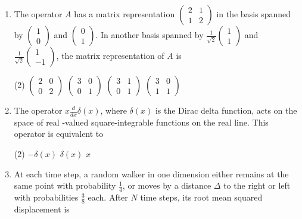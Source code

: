 \begin{enumerate}
\item The operator $A$ has a matrix representation $\left(\begin{array}{ll}2 & 1 \\ 1 & 2\end{array}\right)$ in the basis spanned by $\left(\begin{array}{l}1 \\ 0\end{array}\right)$ and $\left(\begin{array}{l}0 \\ 1\end{array}\right)$. In another basis spanned by $\frac{1}{\sqrt{2}}\left(\begin{array}{l}1 \\ 1\end{array}\right)$ and $\frac{1}{\sqrt{2}}\left(\begin{array}{c}1 \\ -1\end{array}\right)$, the matrix representation of $A$ is
 \begin{tasks}(2)
	\task[\textbf{a.}]$\left(\begin{array}{ll}2 & 0 \\ 0 & 2\end{array}\right)$
	\task[\textbf{b.}]$\left(\begin{array}{ll}3 & 0 \\ 0 & 1\end{array}\right)$
	\task[\textbf{c.}]$\left(\begin{array}{ll}3 & 1 \\ 0 & 1\end{array}\right)$
	\task[\textbf{d.}] $\left(\begin{array}{ll}3 & 0 \\ 1 & 1\end{array}\right)$
\end{tasks}
\item The operator $x \frac{d}{d x} \delta(x)$, where $\delta(x)$ is the Dirac delta function, acts on the space of real -valued square-integrable functions on the real line. This operator is equivalent to
 \begin{tasks}(2)
	\task[\textbf{a.}]$-\delta(x)$
	\task[\textbf{b.}]$\delta(x)$
	\task[\textbf{c.}]$x$
\end{tasks}
\item At each time step, a random walker in one dimension either remains at the same point with probability $\frac{1}{4}$, or moves by a distance $\Delta$ to the right or left with probabilities $\frac{3}{8}$ each. After $N$ time steps, its root mean squared displacement is

\end{enumerate}
